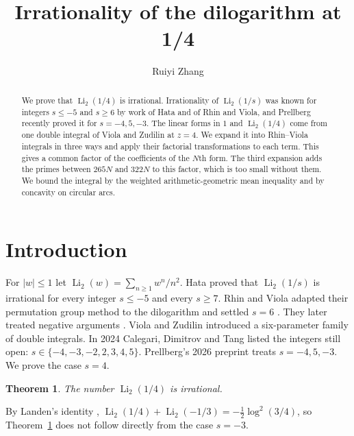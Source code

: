 \documentclass{amsart}
\newtheorem{theorem}{Theorem}
\numberwithin{equation}{section}
\numberwithin{table}{section}
\newcommand{\Li}{\operatorname{Li}}
\begin{document}
\title{Irrationality of the dilogarithm at 1/4}
\author{Ruiyi Zhang}
\address{Independent Researcher, Columbia, Maryland, USA}

\begin{abstract}
We prove that $\operatorname{Li}_2(1/4)$ is irrational. Irrationality of
$\operatorname{Li}_2(1/s)$ was known for integers $s\le-5$ and $s\ge6$ by
work of Hata and of Rhin and Viola, and Prellberg recently proved it for
$s=-4,5,-3$. The linear forms in
$1$ and $\operatorname{Li}_2(1/4)$ come from one double integral of Viola and
Zudilin at $z=4$. We expand it into Rhin--Viola integrals in three ways and
apply their factorial transformations to each term. This gives a common factor
of the coefficients of the $N$th form. The third expansion adds the primes
between $265N$ and $322N$ to this factor, which is too small without them. We
bound the integral by the weighted arithmetic-geometric mean inequality and by
concavity on circular arcs.
\end{abstract}

\maketitle

\section{Introduction}

For $|w|\le1$ let $\Li_2(w)=\sum_{n\ge1}w^n/n^2$. Hata \cite{Ha} proved that
$\Li_2(1/s)$ is irrational for every integer $s\le-5$ and every $s\ge7$. Rhin
and Viola adapted their permutation group method \cite{RV96} to the dilogarithm
and settled $s=6$ \cite{RV05}. They later treated negative arguments
\cite{RV19}. Viola and Zudilin \cite{VZ} introduced a six-parameter family of
double integrals. In 2024 Calegari, Dimitrov and Tang
\cite[Remark~2.8.2 and Section~15.2]{CDT} listed the integers still open:
$s\in\{-4,-3,-2,2,3,4,5\}$. Prellberg's 2026 preprint \cite{Pr} treats
$s=-4,5,-3$. We prove the case $s=4$.

\begin{theorem}\label{thm:main}
The number $\Li_2(1/4)$ is irrational.
\end{theorem}

By Landen's identity \cite[(25.12.3)]{DLMF},
$\Li_2(1/4)+\Li_2(-1/3)=-\frac12\log^2(3/4)$, so Theorem~\ref{thm:main} does
not follow directly from the case $s=-3$.
\end{document}
